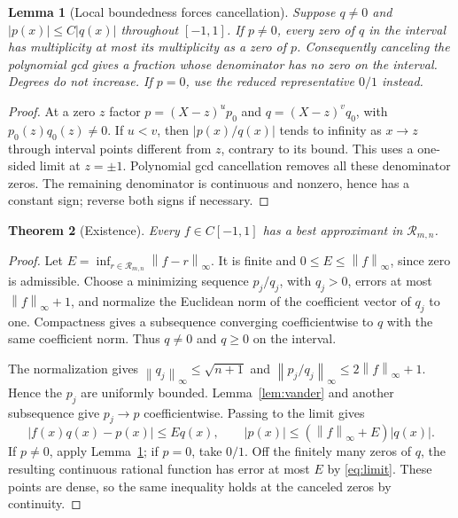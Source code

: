\documentclass[11pt]{article}
\newcommand{\norm}[1]{\left\lVert#1\right\rVert}
\newtheorem{theorem}{Theorem}[section]
\newtheorem{lemma}[theorem]{Lemma}
\theoremstyle{remark}\newtheorem{remark}[theorem]{Remark}
\begin{document}
\begin{lemma}[Local boundedness forces cancellation]\label{lem:cancel}
Suppose $q\ne0$ and $|p(x)|\le C|q(x)|$ throughout $[-1,1]$. If $p\ne0$,
every zero of $q$ in the interval has multiplicity at most its multiplicity
as a zero of $p$. Consequently canceling the polynomial gcd gives a fraction
whose denominator has no zero on the interval. Degrees do not increase.
If $p=0$, use the reduced representative $0/1$ instead.
\end{lemma}
\begin{proof}
At a zero $z$ factor $p=(X-z)^u p_0$ and $q=(X-z)^v q_0$, with
$p_0(z)q_0(z)\ne0$. If $u<v$, then $|p(x)/q(x)|$ tends to infinity as
$x\to z$ through interval points different from $z$, contrary to its bound.
This uses a one-sided limit at $z=\pm1$. Polynomial gcd cancellation removes
all these denominator zeros. The remaining denominator is continuous and
nonzero, hence has a constant sign; reverse both signs if necessary.
\end{proof}

\begin{theorem}[Existence]\label{thm:rexist}
Every $f\in C[-1,1]$ has a best approximant in $\mathcal R_{m,n}$.
\end{theorem}
\begin{proof}
Let $E=\inf_{r\in\mathcal R_{m,n}}\norm{f-r}_\infty$. It is finite and
$0\le E\le\norm f_\infty$, since zero is admissible. Choose a minimizing
sequence $p_j/q_j$, with $q_j>0$, errors at most $\norm f_\infty+1$, and
normalize the Euclidean norm of the coefficient vector of $q_j$ to one.
Compactness gives a subsequence converging coefficientwise to $q$ with the
same coefficient norm. Thus $q\ne0$ and $q\ge0$ on the interval.

The normalization gives $\norm{q_j}_\infty\le\sqrt{n+1}$ and
$\norm{p_j/q_j}_\infty\le2\norm f_\infty+1$. Hence the $p_j$ are uniformly
bounded. Lemma~\ref{lem:vander} and another subsequence give $p_j\to p$
coefficientwise. Passing to the limit gives
\begin{equation}\label{eq:limit}
 |f(x)q(x)-p(x)|\le E q(x),\qquad
 |p(x)|\le(\norm f_\infty+E)|q(x)|.
\end{equation}
If $p\ne0$, apply Lemma~\ref{lem:cancel}; if $p=0$, take $0/1$.
Off the finitely many zeros of $q$, the resulting continuous rational
function has error at most $E$ by \eqref{eq:limit}. These points are dense,
so the same inequality holds at the canceled zeros by continuity.
\end{proof}
\end{document}
